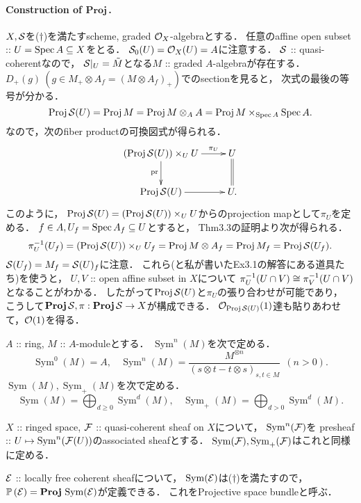 \documentclass[a4paper]{jsarticle}
\newcommand{\gProj}{\mathbf{Proj}\,}
\newcommand{\Sym}{\operatorname{Sym}}
\newcommand{\pbundle}{\mathbb{P}\,}
\begin{document}
    \paragraph{Construction of $\gProj$.}
    $X, \mathcal{S}$を($\dagger$)を満たすscheme, graded $\mathcal{O}_X$-algebraとする．
    任意のaffine open subset :: $U=\operatorname{Spec} A \subseteq X$をとる．
    $\mathcal{S}_0(U)=\mathcal{O}_X(U)=A$に注意する．
    $\mathcal{S}$ :: quasi-coherentなので，
    $\mathcal{S}|_U=\tilde{M}$となる$M$ :: graded $A$-algebraが存在する．
    $D_+(g) ~(g \in M_+ \otimes A_f=(M \otimes A_f)_+)$でのsectionを見ると，
    次式の最後の等号が分かる．
    \[ \operatorname{Proj} \mathcal{S}(U)=\operatorname{Proj} M=\operatorname{Proj} M \otimes_A A=\operatorname{Proj} M \times_{\operatorname{Spec} A} \operatorname{Spec} A. \]
    なので，次のfiber productの可換図式が得られる．
    \[
        \xymatrix
        {
            (\Proj \shS(U)) \times_U U \ar[r]^-{\pi_U} \ar[d]_-{\pr}& U \ar@{=}[d] \\
            \Proj \shS(U) \ar[r]& U.
        }
    \]
    このように，
    $\operatorname{Proj} \mathcal{S}(U)=(\operatorname{Proj} \mathcal{S}(U)) \times_U U$からのprojection mapとして$\pi_U$を定める．
    $f \in A, U_f=\operatorname{Spec} A_f \subseteq U$とすると，
    Thm3.3の証明より次が得られる．
    \[ \pi_U^{-1}(U_f)=(\operatorname{Proj} \mathcal{S}(U)) \times_U U_f=\operatorname{Proj} M \otimes A_f=\operatorname{Proj} M_f=\operatorname{Proj} \mathcal{S}(U_f). \]
    $\mathcal{S}(U_f)=M_f=\mathcal{S}(U)_f$に注意．
    これら(と私が書いたEx3.1の解答にある道具たち)を使うと，
    $U,V$ :: open affine subset in $X$について
    $\pi_U^{-1}(U \cap V) \cong \pi_V^{-1}(U \cap V)$となることがわかる．
    したがって$\operatorname{Proj} \mathcal{S}(U)$と$\pi_U$の張り合わせが可能であり，
    こうして$\gProj \shS, \pi: \gProj \shS \to X$が構成できる．
    $\mathcal{O}_{\operatorname{Proj} \mathcal{S}(U)}(1)$達も貼りあわせて，$\mathcal{O}(1)$を得る．

    \begin{Def}
        $A$ :: ring,
        $M$ :: $A$-moduleとする．
        $\Sym^n(M)$を次で定める．
        \[
            \Sym^0(M)=A,~~~~
            \Sym^n(M)=\frac{M^{\otimes n}}{(s \otimes t-t \otimes s)_{s,t \in M}} ~~(n>0).
        \]
        $\Sym(M), \Sym_+(M)$を次で定める．
        \[
            \Sym(M)=\bigoplus_{d \geq 0} \Sym^d(M),~~~~
            \Sym_+(M)=\bigoplus_{d > 0} \Sym^d(M).
        \]

        $X$ :: ringed space,
        $\mathcal{F}$ :: quasi-coherent sheaf on $X$について，
        $\Sym^n(\shF)$を
        presheaf :: $U \mapsto \Sym^n(\shF(U))$のassociated sheafとする．
        $\Sym(\shF), \Sym_+(\shF)$はこれと同様に定める．
    \end{Def}
    \begin{Def}
        $\mathcal{E}$ :: locally free coherent sheafについて，
        $\Sym(\shE)$は($\dagger$)を満たすので，
        $\pbundle(\shE)=\gProj \Sym(\shE)$が定義できる．
        これをProjective space bundleと呼ぶ．
    \end{Def}
\end{document}
